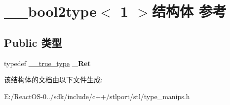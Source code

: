 \hypertarget{struct____bool2type_3_011_01_4}{}\section{\+\_\+\+\_\+bool2type$<$ 1 $>$结构体 参考}
\label{struct____bool2type_3_011_01_4}
\subsection*{Public 类型}
\begin{DoxyCompactItemize}
\item 
\mbox{\label{struct____bool2type_3_011_01_4_a76b6dd3db1f2dda46d3532bc27b4fd20}} 
typedef \hyperlink{struct____true__type}{\+\_\+\+\_\+true\+\_\+type} {\bfseries \+\_\+\+Ret}
\end{DoxyCompactItemize}


该结构体的文档由以下文件生成\+:\begin{DoxyCompactItemize}
\item 
E\+:/\+React\+O\+S-\/0../sdk/include/c++/stlport/stl/type\+\_\+manips.\+h\end{DoxyCompactItemize}
